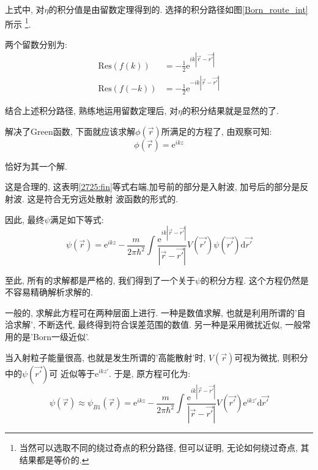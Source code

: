 \documentclass[a4paper, 11pt]{article}
\begin{document}
\begin{spacing}{1.2}
          上式中, 对$\eta$的积分值是由留数定理得到的. 选择的积分路径如图\ref{Born_route_int}所示
          \footnote{当然可以选取不同的绕过奇点的积分路径, 但可以证明, 无论如何绕过奇点, 其结果都是等价的.}.

            
          两个留数分别为:
          \begin{equation}
            \begin{aligned}
              \mathrm{Res}(f(k)) &= -\frac{1}{2}\mathrm{e}^{ik\left|\vec{r}-\vec{r'}\right|} \\
              \mathrm{Res}(f(-k)) &= -\frac{1}{2}\mathrm{e}^{-ik\left|\vec{r}-\vec{r'}\right|}
            \end{aligned}
          \end{equation}

          结合上述积分路径, 熟练地运用留数定理后, 对$\eta$的积分结果就是显然的了.

          解决了Green函数, 下面就应该求解$\phi(\vec{r})$所满足的方程了, 由观察可知:
          \begin{equation}
            \phi(\vec{r}) = \mathrm{e}^{ikz}
          \end{equation}
          
          恰好为其一个解.

          这是合理的, 这表明\eqref{2725:fin}等式右端,加号前的部分是入射波, 加号后的部分是反射波. 这是符合无穷远处散射
          波函数的形式的. 
          
          因此, 最终$\psi$满足如下等式:
          \begin{equation}
            \psi(\vec{r}) = \mathrm{e}^{ikz} - \dfrac{m}{2\pi\hbar^2} %
                            \int\dfrac{\mathrm{e}^{ik\left|\vec{r}-\vec{r'}\right|}}%
                                      {\left|\vec{r}-\vec{r'}\right|}V(\vec{r'})%
                                      \psi(\vec{r'})\mathrm{d}\vec{r'}
          \end{equation}

          至此, 所有的求解都是严格的, 我们得到了一个关于$\psi$的积分方程. 这个方程仍然是不容易精确解析求解的. 

          一般的, 求解此方程可在两种层面上进行. 一种是数值求解, 也就是利用所谓的'自洽求解', 不断迭代, 最终得到符合误差范围的数值. 
          另一种是采用微扰近似, 一般常用的是'Born一级近似'.
          
          当入射粒子能量很高, 也就是发生所谓的'高能散射'时, $V(\vec{r})$可视为微扰, 则积分中的$\psi(\vec{r'})$可
          近似等于$\mathrm{e}^{ikz'}$. 于是, 原方程可化为:
          \begin{equation}
            \psi(\vec{r}) \approx \psi_{B1}(\vec{r})= \mathrm{e}^{ikz} - \dfrac{m}{2\pi\hbar^2} %
                                                      \int\dfrac{\mathrm{e}^{ik\left|\vec{r}-\vec{r'}\right|}}%
                                                                {\left|\vec{r}-\vec{r'}\right|}V(\vec{r'})%
                                                                  \mathrm{e}^{ikz'}\mathrm{d}\vec{r'}
          \end{equation}


\end{spacing}
\end{document}
